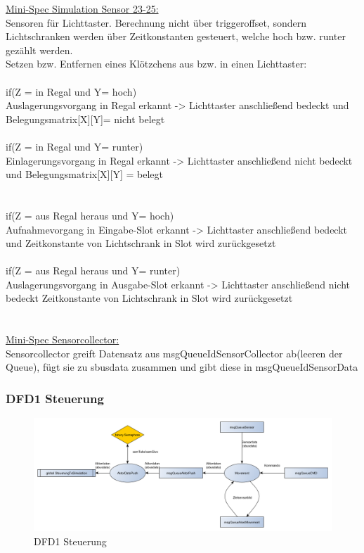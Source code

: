 \underline{Mini-Spec Simulation Sensor 23-25:}\\
Sensoren für Lichttaster.
Berechnung nicht über triggeroffset, sondern Lichtschranken werden über Zeitkonstanten gesteuert, welche hoch bzw. runter gezählt werden.\\
Setzen bzw. Entfernen eines Klötzchens aus bzw. in einen Lichttaster:\\ \\
if(Z = in Regal und Y= hoch) \\
Auslagerungsvorgang in Regal erkannt -> Lichttaster anschließend bedeckt und Belegungsmatrix[X][Y]= nicht belegt\\
\\
if(Z = in Regal und Y= runter)\\
Einlagerungsvorgang in Regal erkannt -> Lichttaster anschließend nicht bedeckt und Belegungsmatrix[X][Y] = belegt \\
\\
\\
if(Z = aus Regal heraus und Y= hoch)\\
Aufnahmevorgang in Eingabe-Slot erkannt -> Lichttaster anschließend bedeckt und Zeitkonstante von Lichtschrank in Slot wird zurückgesetzt\\
\\
if(Z = aus Regal heraus und Y= runter)\\
Auslagerungsvorgang in Ausgabe-Slot erkannt -> Lichttaster anschließend nicht bedeckt  Zeitkonstante von Lichtschrank in Slot wird zurückgesetzt\ \\
\\
\\
\underline{Mini-Spec Sensorcollector:}\\
Sensorcollector greift Datensatz aus msgQueueIdSensorCollector ab(leeren der Queue), fügt sie zu sbusdata zusammen und gibt diese in msgQueueIdSensorData\\ 


\subsubsection{DFD1 Steuerung}
\begin{figure}[H]
	\centering
  \includegraphics[width=\textwidth]{DFD/dfd1_steuerung.png}
	\caption{DFD1 Steuerung}
	\label{fig3}
\end{figure}

